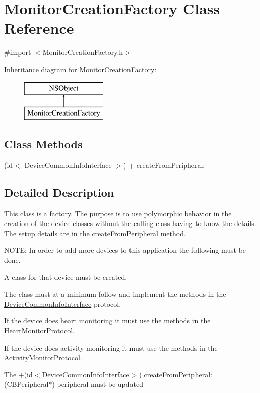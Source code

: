 \hypertarget{interface_monitor_creation_factory}{\section{Monitor\-Creation\-Factory Class Reference}
\label{interface_monitor_creation_factory}
}


{\ttfamily \#import $<$Monitor\-Creation\-Factory.\-h$>$}

Inheritance diagram for Monitor\-Creation\-Factory\-:\begin{figure}[H]
\begin{center}
\leavevmode
\includegraphics[height=2.000000cm]{interface_monitor_creation_factory}
\end{center}
\end{figure}
\subsection*{Class Methods}
\begin{DoxyCompactItemize}
\item 
(id$<$ \hyperlink{protocol_device_common_info_interface-p}{Device\-Common\-Info\-Interface} $>$) + \hyperlink{interface_monitor_creation_factory_abe947f8b7d9f30a4438112bbdea8dda1}{create\-From\-Peripheral\-:}
\end{DoxyCompactItemize}


\subsection{Detailed Description}
This class is a factory. The purpose is to use polymorphic behavior in the creation of the device classes without the calling class having to know the details. The setup details are in the create\-From\-Peripheral method.

N\-O\-T\-E\-: In order to add more devices to this application the following must be done.


\begin{DoxyEnumerate}
\item A class for that device must be created.
\item The class must at a minimum follow and implement the methods in the \hyperlink{protocol_device_common_info_interface-p}{Device\-Common\-Info\-Interface} protocol.
\item If the device does heart monitoring it must use the methods in the \hyperlink{protocol_heart_monitor_protocol-p}{Heart\-Monitor\-Protocol}.
\item If the device does activity monitoring it must use the methods in the \hyperlink{protocol_activity_monitor_protocol-p}{Activity\-Monitor\-Protocol}.
\item The +(id$<$\-Device\-Common\-Info\-Interface$>$) create\-From\-Peripheral\-: (C\-B\-Peripheral$\ast$) peripheral must be updated 
\end{DoxyEnumerate}

